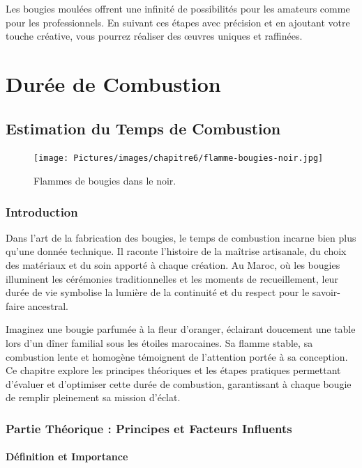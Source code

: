\documentclass[11pt,fleqn,onecolumn,oneside]{book}
\begin{document}
\begin{remark}
Les bougies moulées offrent une infinité de possibilités pour les amateurs comme pour les professionnels. En suivant ces étapes avec précision et en ajoutant votre touche créative, vous pourrez réaliser des œuvres uniques et raffinées.
\end{remark}

\part{Durée de Combustion}
\chapter{Estimation du Temps de Combustion}

\begin{figure}[H]
    \centering
    \texttt{[image: Pictures/images/chapitre6/flamme-bougies-noir.jpg]}
    \caption{Flammes de bougies dans le noir.}
    \label{fig:bougie_flamme}
\end{figure}


\section{Introduction}

Dans l’art de la fabrication des bougies, le temps de combustion incarne bien plus qu’une donnée technique. Il raconte l’histoire de la maîtrise artisanale, du choix des matériaux et du soin apporté à chaque création. Au Maroc, où les bougies illuminent les cérémonies traditionnelles et les moments de recueillement, leur durée de vie symbolise la lumière de la continuité et du respect pour le savoir-faire ancestral.

Imaginez une bougie parfumée à la fleur d’oranger, éclairant doucement une table lors d’un dîner familial sous les étoiles marocaines. Sa flamme stable, sa combustion lente et homogène témoignent de l’attention portée à sa conception. Ce chapitre explore les principes théoriques et les étapes pratiques permettant d’évaluer et d’optimiser cette durée de combustion, garantissant à chaque bougie de remplir pleinement sa mission d’éclat.

\section{Partie Théorique : Principes et Facteurs Influents}

\subsection*{Définition et Importance}
\end{document}
